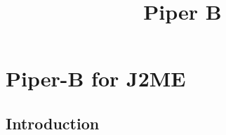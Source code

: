 

\newtheorem{atheorem}{Theorem}[section]
\newtheorem{adefinition}{Definition}[section]
\newtheorem{analgo}{Algorithm}[section]
\newtheorem{anexample}{Example}[section]

\newtheorem{acorollary}[atheorem]{Korollar}
\newtheorem{asubtheo}[atheorem]{Lemma}
\newtheorem{atinytheo}[atheorem]{Proposition}
\newcommand{\Path}{{\rm Path}}
\newcommand{\LO}{{\rm LO}}
\newcommand{\Abl}{\mbox{\rm Abl}}
\newcommand{\LAST}{{\rm fin}}
\newcommand{\DIST}{\mbox{\rm DIST}}
\newcommand{\Root}{{\rm root}}
\newcommand{\Front}{\mbox{\rm front}}
\newcommand{\KOST}{{\cal C}}
\newcommand{\Choose}{{\rm Choose}}
\newcommand{\Eword}{\Box}
\newcommand{\Pbegin}{{\rm\bf begin }}
\newcommand{\Pprocedure}{{\rm\bf procedure }}
\newcommand{\Pfunction}{{\rm\bf function }}
\newcommand{\Pinteger}{{\rm\bf integer}}
\newcommand{\Pend}{{\rm\bf end }}
\newcommand{\Pfor}{{\rm\bf for }}
\newcommand{\Pforall}{{\rm\bf for all }}
\newcommand{\Pendfor}{{\rm\bf endfor }}
\newcommand{\Pto}{{\rm\bf to }}
\newcommand{\Pdownto}{{\rm\bf downto }}
\newcommand{\Pdo}{{\rm\bf do }}
\newcommand{\Pif}{{\rm\bf if }}
\newcommand{\Pthen}{{\rm\bf then }}
\newcommand{\Pendif}{{\rm\bf endif }}
\newcommand{\Pelse}{{\rm\bf else }}
\newcommand{\Pendelse}{{\rm\bf endelse }}
\newcommand{\Preturn}{{\rm\bf return }}
\newcommand{\Real}{{\rm{I\hspace*{-0.4ex}R}}}
\newcommand{\Nat}{{\rm{I\hspace*{-0.4ex}N}}}
\newcommand{\Bool}{{\rm{I\hspace*{-0.4ex}B}}}
\newcommand{\Uint}{{\rm{I\hspace*{-0.5ex}I}}}
\newcommand{\Zet}{{\rm\sf Z\hspace*{-1.0ex}Z}}
\newcommand{\QuestEq}{\stackrel{?}{=}}
\newcommand{\DefEq}{:=}
\newcommand{\DisUnion}{\stackrel{.}{\cup}}
\newcommand{\IsPref}{\le_{\mbox{\tiny pr"af}}}


\title{
{\LARGE Piper B}\\
}

\maketitle


\chapter{Piper-B for J2ME}

\section{Introduction}

